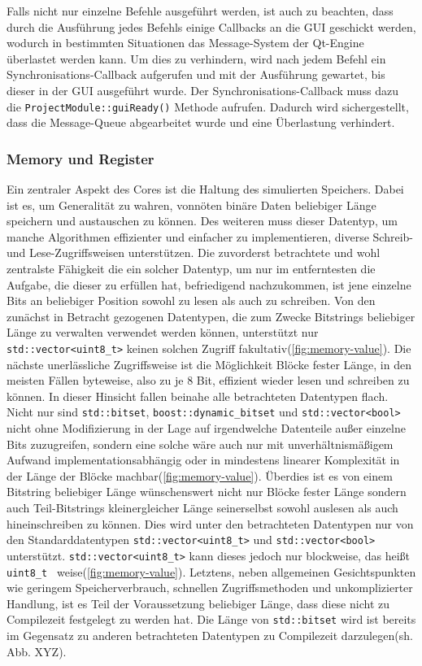 Falls nicht nur einzelne Befehle ausgeführt werden, ist auch zu beachten, dass
durch die Ausführung jedes Befehls einige Callbacks an die GUI geschickt werden,
wodurch in bestimmten Situationen das Message-System der Qt-Engine überlastet
werden kann. Um dies zu verhindern, wird nach jedem Befehl ein
Synchronisations-Callback aufgerufen und mit der Ausführung gewartet, bis dieser
in der GUI ausgeführt wurde. Der Synchronisations-Callback muss dazu die
\texttt{ProjectModule::guiReady()} Methode aufrufen. Dadurch wird
sichergestellt, dass die Message-Queue abgearbeitet wurde und eine Überlastung
verhindert.

\subsubsection{Memory und Register}

Ein zentraler Aspekt des Cores ist die Haltung des simulierten Speichers. Dabei ist es, um Generalität zu wahren, vonnöten binäre Daten beliebiger Länge speichern und austauschen zu können. Des weiteren muss dieser Datentyp, um manche Algorithmen effizienter und einfacher zu implementieren, diverse Schreib- und Lese-Zugriffsweisen unterstützen. Die zuvorderst betrachtete und wohl zentralste Fähigkeit die ein solcher Datentyp, um nur im entferntesten die Aufgabe, die dieser zu erfüllen hat, befriedigend nachzukommen, ist jene einzelne Bits an beliebiger Position sowohl zu lesen als auch zu schreiben. Von den zunächst in Betracht gezogenen Datentypen, die zum Zwecke Bitstrings beliebiger Länge zu verwalten verwendet werden können, unterstützt nur \texttt{std::vector<uint8\_t>} keinen solchen Zugriff fakultativ(\autoref{fig:memory-value}). Die nächste unerlässliche Zugriffsweise ist die Möglichkeit Blöcke fester Länge, in den meisten Fällen byteweise, also zu je 8 Bit, effizient wieder lesen und schreiben zu können. In dieser Hinsicht fallen beinahe alle betrachteten Datentypen flach. Nicht nur sind \texttt{std::bitset}, \texttt{boost::dynamic\_bitset} und \texttt{std::vector<bool>} nicht ohne Modifizierung in der Lage auf irgendwelche Datenteile außer einzelne Bits zuzugreifen, sondern eine solche wäre auch nur mit unverhältnismäßigem Aufwand implementationsabhängig oder in mindestens linearer Komplexität in der Länge der Blöcke machbar(\autoref{fig:memory-value}). Überdies ist es von einem Bitstring beliebiger Länge wünschenswert nicht nur Blöcke fester Länge sondern auch Teil-Bitstrings kleinergleicher Länge seinerselbst sowohl auslesen als auch hineinschreiben zu können. Dies wird unter den betrachteten Datentypen nur von den Standarddatentypen \texttt{std::vector<uint8\_t>} und \texttt{std::vector<bool>} unterstützt. \texttt{std::vector<uint8\_t>} kann dieses jedoch nur blockweise, das heißt \texttt{uint8\_t } weise(\autoref{fig:memory-value}). Letztens, neben allgemeinen Gesichtspunkten wie geringem Speicherverbrauch, schnellen Zugriffsmethoden und unkomplizierter Handlung, ist es Teil der Voraussetzung beliebiger Länge, dass diese nicht zu Compilezeit festgelegt zu werden hat. Die Länge von \texttt{std::bitset} wird ist bereits im Gegensatz zu anderen betrachteten Datentypen zu Compilezeit darzulegen(sh. Abb. XYZ).

